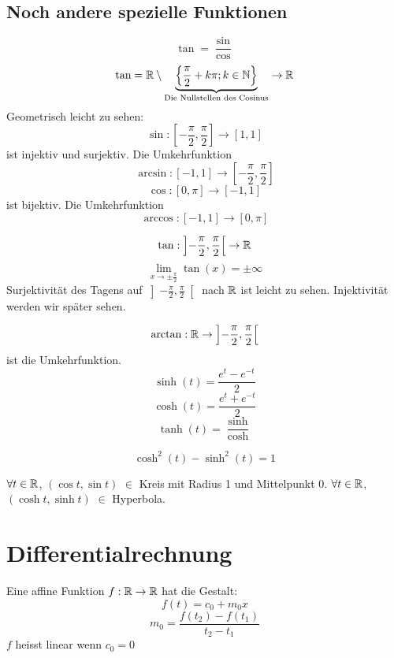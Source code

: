\subsection{Noch andere spezielle Funktionen}
\[\tan=\frac{\sin}{\cos}\]
\[\tan=\mathbb{R}\setminus\underbrace{\left\{ \frac{\pi}{2}+k\pi; k\in\mathbb{N} \right\}}_{\text{Die Nullstellen des Cosinus}}\to\mathbb{R}\]
Geometrisch leicht zu sehen: 
\[\sin:\left[ -\frac{\pi}{2},\frac{\pi}{2} \right]\to\left[ 1,1 \right]\]
ist injektiv und surjektiv. Die Umkehrfunktion
\[\arcsin:\left[ -1,1 \right]\to\left[ -\frac{\pi}{2},\frac{\pi}{2} \right]\]
\[\cos:\left[ 0,\pi \right]\to\left[ -1,1 \right]\]
ist bijektiv. Die Umkehrfunktion
\[\arccos:\left[ -1,1 \right]\to\left[ 0,\pi \right]\]
\begin{Bem}
  \[\tan:\left] -\frac{\pi}{2},\frac{\pi}{2} \right[\to\mathbb{R}\]
  \[\lim_{x\to\pm\frac{\pi}{2}}\tan(x)=\pm\infty\]
  Surjektivität des Tagens auf $\left] -\frac{\pi}{2}, \frac{\pi}{2} \right[$ nach $\mathbb{R}$ ist leicht zu sehen. Injektivität werden wir später sehen.
\end{Bem}
\[\arctan:\mathbb{R}\to\left] -\frac{\pi}{2},\frac{\pi}{2} \right[\]
ist die Umkehrfunktion.
\[\sinh(t)=\frac{e^t-e^{-t}}{2}\]
\[\cosh(t)=\frac{e^t+e^{-t}}{2}\]
\[\tanh(t)=\frac{\sinh}{\cosh}\]
\begin{Bem}
  \[\cosh^2(t)-\sinh^2(t)=1\]
\end{Bem}
\begin{Bem}
  $\forall t\in\mathbb{R}$, $\left( \cos t, \sin t \right)$ $\in$ Kreis mit Radius 1 und Mittelpunkt 0. $\forall t\in\mathbb{R}$, $\left( \cosh t, \sinh t \right)$ $\in$ Hyperbola.
\end{Bem}
\section{Differentialrechnung}
Eine affine Funktion $f:\mathbb{R}\to\mathbb{R}$ hat die Gestalt:
\[f(t)=c_0+m_0x\]
\[m_0=\frac{f(t_2)-f(t_1)}{t_2-t_1}\]
$f$ heisst linear wenn $c_0=0$

